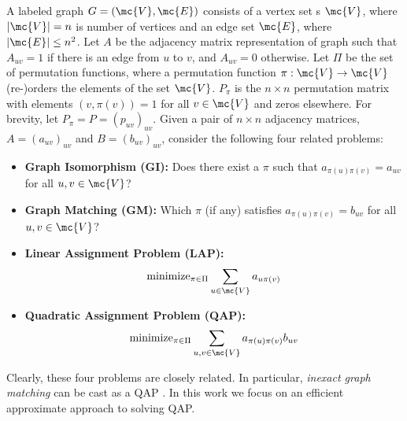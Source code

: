 \documentclass[10pt,journal,cspaper,compsoc]{IEEEtran}
\newcommand{\PmcP}{P \in \mc{P}}
\begin{document}
A labeled graph $G=(\mc{V},\mc{E})$ consists of a vertex set s $\mc{V}$, where $|\mc{V}|=n$ is number of vertices and an edge set $\mc{E}$, where $|\mc{E}| \leq n^2$.  Let $A$ be the adjacency matrix representation of graph such that $A_{uv}=1$ if there is an edge from $u$ to $v$, and $A_{uv}=0$ otherwise. 
Let  $\Pi$ be the set of permutation functions, where a permutation function $\pi: \mc{V} \to \mc{V}$ (re-)orders the elements of the set $\mc{V}$.  $P_{\pi}$ is the $n \times n$ permutation matrix with elements $(v,\pi(v))=1$ for all $v \in \mc{V}$ and zeros elsewhere. For brevity, let $P_{\pi}=P=(p_{uv})_{uv}$. Given a pair of $n \times n$ adjacency matrices, $A=(a_{uv})_{uv}$ and $B=(b_{uv})_{uv}$, consider the following four related problems:
\begin{itemize}
	\item \textbf{Graph Isomorphism (GI):}  Does there exist a $\pi$ such that $a_{\pi(u)\pi(v)}=a_{uv}$ for all $u,v \in \mc{V}$?
	\item \textbf{Graph Matching (GM):} Which $\pi$ (if any) satisfies $a_{\pi(u)\pi(v)}=b_{uv}$ for all $u,v \in \mc{V}$?
	\item \textbf{Linear Assignment Problem (LAP):} 
	\begin{align}
		\text{minimize}_{\pi \in \Pi} \sum_{u \in \mc{V}} a_{u \pi(v)}
	\end{align}
	\item \textbf{Quadratic Assignment Problem (QAP):} 
	\begin{align}
		\text{minimize}_{\pi \in \Pi} \sum_{u,v \in \mc{V}} a_{\pi(u) \pi(v)}b_{uv}
	\end{align}
\end{itemize}

Clearly, these four problems are closely related. In particular, \emph{inexact graph matching} can be cast as a QAP \cite{Burkard2009}.  In this work we focus on an efficient approximate approach to solving QAP.  


\end{document}
